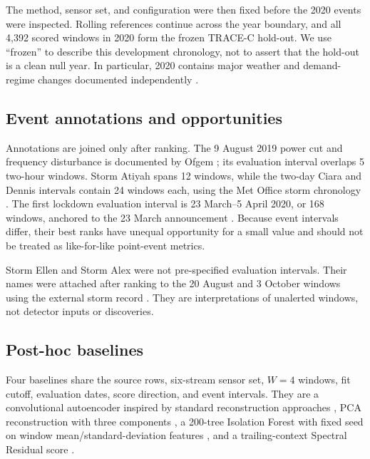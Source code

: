 The method, sensor set, and configuration were then fixed before the 2020
events were inspected. Rolling references continue across the year boundary,
and all 4,392 scored windows in 2020 form the frozen TRACE-C hold-out. We use
``frozen'' to describe this development chronology, not to assert that the
hold-out is a clean null year. In particular, 2020 contains major weather and
demand-regime changes documented independently
\citep{metoffice2020stormseason,ukgov2020lockdown,ngeso2021endyear}.

\subsection{Event annotations and opportunities}

Annotations are joined only after ranking. The 9 August 2019 power cut and
frequency disturbance is documented by Ofgem \citep{ofgem2020poweroutage}; its
evaluation interval overlaps 5 two-hour windows. Storm Atiyah spans 12 windows,
while the two-day Ciara and Dennis intervals contain 24 windows each, using the
Met Office storm chronology \citep{metoffice2020stormseason}. The first
lockdown evaluation interval is 23 March--5 April 2020, or 168 windows, anchored
to the 23 March announcement \citep{ukgov2020lockdown}. Because event intervals
differ, their best ranks have unequal opportunity for a small value and should
not be treated as like-for-like point-event metrics.

Storm Ellen and Storm Alex were not pre-specified evaluation intervals. Their
names were attached after ranking to the 20 August and 3 October windows using
the external storm record \citep{metoffice2020stormseason,metoffice2020stormalex}.
They are interpretations of unalerted windows, not detector inputs or
discoveries.

\subsection{Post-hoc baselines}

Four baselines share the source rows, six-stream sensor set, $W=4$ windows,
fit cutoff, evaluation dates, score direction, and event intervals. They are a
convolutional autoencoder inspired by standard reconstruction approaches
\citep{sakurada2014autoencoders,vijay2020kerasautoencoder}, PCA reconstruction
with three components \citep{jackson1979pcaresiduals}, a 200-tree Isolation
Forest with fixed seed on window mean/standard-deviation features
\citep{liu2008isolationforest}, and a trailing-context Spectral Residual score
\citep{ren2019spectralresidual}.

